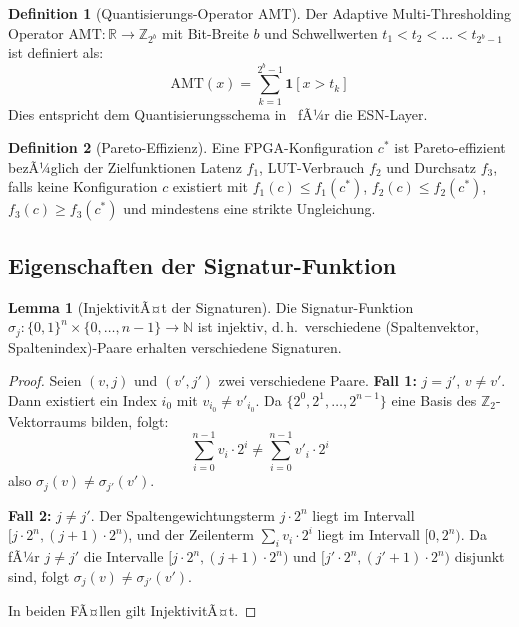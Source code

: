 ﻿\documentclass[a4paper,12pt]{article}
\theoremstyle{definition}
\newtheorem{definition}{Definition}
\newtheorem{lemma}{Lemma}
\begin{document}
\begin{definition}[Quantisierungs-Operator AMT]
    Der Adaptive Multi-Thresholding Operator $\text{AMT}: \mathbb{R} \to \mathbb{Z}_{2^b}$
    mit Bit-Breite $b$ und Schwellwerten $t_1 < t_2 < \ldots < t_{2^b - 1}$ ist definiert als:
    \[
        \text{AMT}(x) = \sum_{k=1}^{2^b - 1} \mathbf{1}[x > t_k]
    \]
    Dies entspricht dem Quantisierungsschema in~\cite{jafari2025} fÃ¼r die ESN-Layer.
\end{definition}

\begin{definition}[Pareto-Effizienz]
    Eine FPGA-Konfiguration $c^*$ ist Pareto-effizient bezÃ¼glich der Zielfunktionen
    Latenz $f_1$, LUT-Verbrauch $f_2$ und Durchsatz $f_3$, falls keine Konfiguration $c$
    existiert mit $f_1(c) \leq f_1(c^*)$, $f_2(c) \leq f_2(c^*)$, $f_3(c) \geq f_3(c^*)$
    und mindestens eine strikte Ungleichung.
\end{definition}

\subsection{Eigenschaften der Signatur-Funktion}

\begin{lemma}[InjektivitÃ¤t der Signaturen]
\label{lem:injektiv}
    Die Signatur-Funktion $\sigma_j: \{0,1\}^n \times \{0,\ldots,n-1\} \to \mathbb{N}$
    ist injektiv, d.\,h.\ verschiedene (Spaltenvektor, Spaltenindex)-Paare erhalten
    verschiedene Signaturen.
\end{lemma}

\begin{proof}
    Seien $(v, j)$ und $(v', j')$ zwei verschiedene Paare.
    \textbf{Fall 1:} $j = j'$, $v \neq v'$. Dann existiert ein Index $i_0$ mit $v_{i_0} \neq v'_{i_0}$.
    Da $\{2^0, 2^1, \ldots, 2^{n-1}\}$ eine Basis des $\mathbb{Z}_2$-Vektorraums bilden, folgt:
    \[
        \sum_{i=0}^{n-1} v_i \cdot 2^i \neq \sum_{i=0}^{n-1} v'_i \cdot 2^i
    \]
    also $\sigma_j(v) \neq \sigma_{j'}(v')$.
    
    \textbf{Fall 2:} $j \neq j'$. Der Spaltengewichtungsterm $j \cdot 2^n$ liegt im Intervall
    $[j \cdot 2^n, (j+1) \cdot 2^n)$, und der Zeilenterm $\sum_{i} v_i \cdot 2^i$ liegt im Intervall
    $[0, 2^n)$. Da fÃ¼r $j \neq j'$ die Intervalle $[j \cdot 2^n, (j+1) \cdot 2^n)$ und
    $[j' \cdot 2^n, (j'+1) \cdot 2^n)$ disjunkt sind, folgt $\sigma_j(v) \neq \sigma_{j'}(v')$.
    
    In beiden FÃ¤llen gilt InjektivitÃ¤t.
\end{proof}
\end{document}
